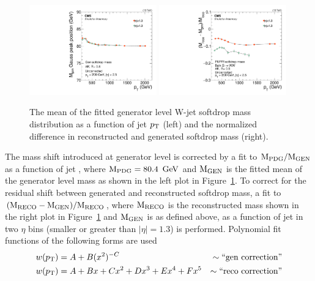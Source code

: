\begin{figure}[htbp]
\centering
\includegraphics[width=0.49\textwidth]{figures/analysis/search2/AN-16-235/plots/GenSoftdropMass_vspt.pdf}
\includegraphics[width=0.49\textwidth]{figures/analysis/search2/AN-16-235/plots/MassShift_vspt.pdf}
\caption{The mean of the fitted generator level W-jet softdrop mass distribution as a function of jet $p_{\mathrm{T}}$ (left) and the normalized difference in reconstructed and generated softdrop mass (right).}
\label{fig:searchII:sdmassshifts}
\end{figure}
The mass shift introduced at generator level is corrected by a fit to $\rm{M_{PDG}/M_{GEN}}$ as a function of jet \PT, where $\rm{M_{PDG}}=80.4~\,\text{Ge\hspace{-.08em}V}$ and $\rm{M_{GEN}}$ is the fitted mean of the generator level mass as shown in the left plot in Figure~\ref{fig:searchII:sdmassshifts}. To correct for the residual shift between generated and reconstructed softdrop mass, a fit to $\rm{(M_{RECO}-M_{GEN})/M_{RECO}}$, where $\rm{M_{RECO}}$ is the reconstructed mass shown in the right plot in Figure~\ref{fig:searchII:sdmassshifts} and $\rm{M_{GEN}}$ is as defined above, as a function of jet \PT in two $\eta$ bins (smaller or greater than $|\eta|=1.3$) is performed.
Polynomial fit functions of the following forms are used
\begin{align*} 
w(p_{\mathrm{T}}) &=  A  +B(x^{2})^{-C}          &\sim\textrm{``gen correction''}\\
w(p_{\mathrm{T}}) &=  A  +Bx+Cx^2+Dx^3+Ex^4+Fx^5 &\sim\textrm{``reco correction''} 
\end{align*}
